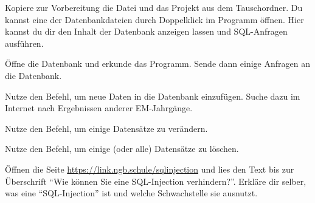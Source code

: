\documentclass[10pt, a4paper, ngerman]{arbeitsblatt}
\begin{document}
\ReiheTitel

Kopiere zur Vorbereitung die Datei  und das Projekt  aus dem Tauschordner. Du kannst eine der Datenbankdateien durch Doppelklick im Programm  öffnen. Hier kannst du dir den Inhalt der Datenbank anzeigen lassen und SQL-Anfragen ausführen.

\begin{aufgabe}[icon=\iconPartner\,\iconLaptop]
	\begin{teilaufgaben}
		\teilaufgabe
		Öffne die Datenbank  und erkunde das Programm. Sende dann einige  Anfragen an die Datenbank.

		\teilaufgabe
		Nutze den  Befehl, um neue Daten in die Datenbank einzufügen. Suche dazu im Internet nach Ergebnissen anderer EM-Jahrgänge.

		\teilaufgabe
		Nutze den  Befehl, um einige Datensätze zu verändern.

		\teilaufgabe
		Nutze den  Befehl, um einige (oder alle) Datensätze zu löschen.
	\end{teilaufgaben}


\end{aufgabe}

\begin{aufgabe}[icon=\iconPartner\,\iconLaptop]
	Öffnen die Seite \url{https://link.ngb.schule/sqlinjection} und lies den Text bis zur Überschrift \enquote{Wie können Sie eine SQL-Injection verhindern?}. Erkläre dir selber, was eine \enquote{SQL-Injection} ist und welche Schwachstelle sie ausnutzt.

\end{aufgabe}
\end{document}
